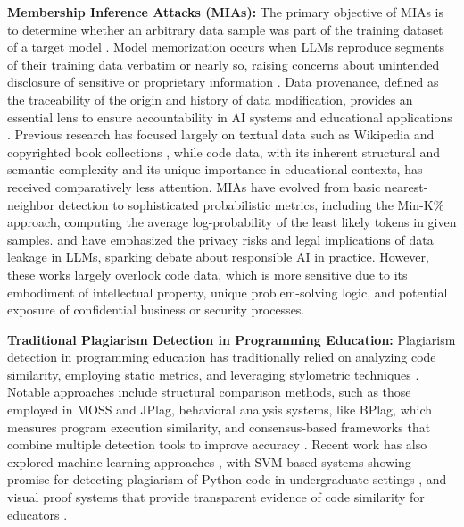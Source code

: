 \documentclass[runningheads]{llncs}
\begin{document}

\noindent \textbf{Membership Inference Attacks (MIAs):} The primary objective of MIAs is to determine whether an arbitrary data sample was part of the training dataset of a target model \cite{r44}. Model memorization occurs when LLMs reproduce segments of their training data verbatim or nearly so, raising concerns about unintended disclosure of sensitive or proprietary information \cite{r45}. Data provenance, defined as the traceability of the origin and history of data modification, provides an essential lens to ensure accountability in AI systems and educational applications \cite{r46}. Previous research has focused largely on textual data such as Wikipedia and copyrighted book collections \cite{r1}, while code data, with its inherent structural and semantic complexity and its unique importance in educational contexts, has received comparatively less attention. MIAs have evolved from basic nearest-neighbor detection to sophisticated probabilistic metrics, including the Min-K\% approach, computing the average log-probability of the least likely tokens in given samples. \cite{r3} and \cite{r4} have emphasized the privacy risks and legal implications of data leakage in LLMs, sparking debate about responsible AI in practice. However, these works largely overlook code data, which is more sensitive due to its embodiment of intellectual property, unique problem-solving logic, and potential exposure of confidential business or security processes.




\noindent \textbf{Traditional Plagiarism Detection in Programming Education:} Plagiarism detection in programming education has traditionally relied on analyzing code similarity, employing static metrics, and leveraging stylometric techniques \cite{r18, r66}. Notable approaches include structural comparison methods, such as those employed in MOSS and JPlag, behavioral analysis systems, like BPlag, which measures program execution similarity, and consensus-based frameworks that combine multiple detection tools to improve accuracy \cite{r60, r67}. Recent work has also explored machine learning approaches \cite{r61}, with SVM-based systems showing promise for detecting plagiarism of Python code in undergraduate settings \cite{r62}, and visual proof systems that provide transparent evidence of code similarity for educators \cite{r59}. 
\end{document}
